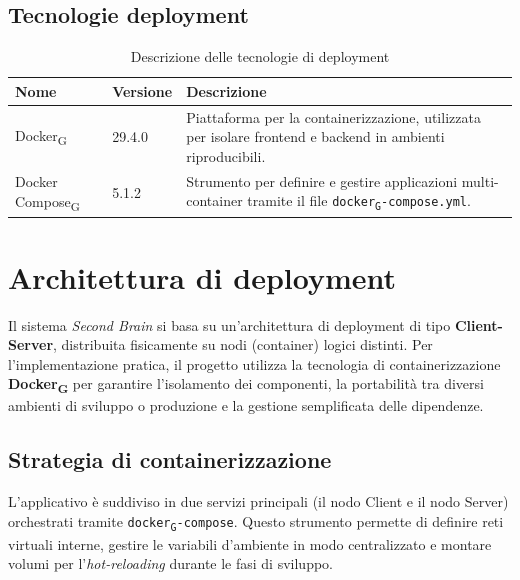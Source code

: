 \documentclass[11pt,a4paper]{article}
\newcommand{\gls}[1]{#1\textsubscript{G}}
\begin{document}
\subsection{Tecnologie deployment}
\begin{table}[H]
    \centering
    \begin{tabular}{|p{}|p{}|p{}|}
        \hline
        \textbf{Nome} & \textbf{Versione} & \textbf{Descrizione} \\
        \hline
        \gls{Docker} & 29.4.0 & Piattaforma per la containerizzazione, utilizzata per isolare frontend e backend in ambienti riproducibili. \\
        \hline
        \gls{Docker Compose} & 5.1.2 & Strumento per definire e gestire applicazioni multi-container tramite il file \texttt{\gls{docker}-compose.yml}. \\
        \hline
    \end{tabular}
    \caption{Descrizione delle tecnologie di deployment}
    \label{tab:tecnologie_deployment}
\end{table}

\newpage

\section{Architettura di deployment}
Il sistema \textit{Second Brain} si basa su un'architettura di deployment di tipo \textbf{Client-Server}, distribuita fisicamente su nodi (container) logici distinti. Per l'implementazione pratica, il progetto utilizza la tecnologia di containerizzazione \textbf{\gls{Docker}} per garantire l'isolamento dei componenti, la portabilità tra diversi ambienti di sviluppo o produzione e la gestione semplificata delle dipendenze.

\subsection{Strategia di containerizzazione}
L'applicativo è suddiviso in due servizi principali (il nodo Client e il nodo Server) orchestrati tramite \texttt{\gls{docker}-compose}. Questo strumento permette di definire reti virtuali interne, gestire le variabili d'ambiente in modo centralizzato e montare volumi per l'\textit{hot-reloading} durante le fasi di sviluppo.
\end{document}
